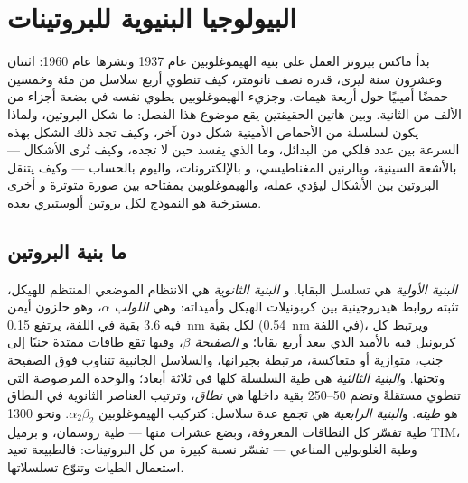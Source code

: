 \chapter{البيولوجيا البنيوية للبروتينات}\label{ch:b3:structural-biology}

بدأ ماكس بيروتز العمل على بنية الهيموغلوبين عام 1937 ونشرها
عام 1960: اثنتان وعشرون سنة ليرى،  قدره نصف
نانومتر، كيف تنطوي أربع سلاسل من مئة وخمسين حمضًا أمينيًا
حول أربعة هيمات. وجزيء الهيموغلوبين يطوي نفسه في بضعة
أجزاء من الألف من الثانية. وبين هاتين الحقيقتين يقع موضوع هذا
الفصل: ما شكل البروتين، ولماذا يكون لسلسلة من الأحماض الأمينية
شكل دون آخر، وكيف تجد ذلك الشكل بهذه السرعة بين عدد
فلكي من البدائل، وما الذي يفسد حين لا تجده،
وكيف تُرى الأشكال --- بالأشعة السينية، وبالرنين المغناطيسي، و
بالإلكترونات، واليوم بالحساب --- وكيف يتنقل البروتين بين
الأشكال ليؤدي عمله، والهيموغلوبين بمفتاحه بين صورة متوترة و
أخرى مسترخية هو النموذج لكل بروتين ألوستيري بعده.

\section{ما بنية البروتين}

\begin{definition}\label{def:b3:structural-biology:levels}
\emph{البنية الأولية} هي تسلسل البقايا. و
\emph{البنية الثانوية} هي الانتظام الموضعي المنتظم
للهيكل، تثبته روابط هيدروجينية بين كربونيلات الهيكل
وأميداته: وهي \emph{اللولب $\alpha$}، وهو حلزون أيمن فيه $3.6$
بقية في اللفة، يرتفع \qty{0.15}{nm} لكل بقية (\qty{0.54}{nm}
في اللفة)، ويرتبط كل كربونيل فيه بالأميد الذي يبعد أربع بقايا؛ و
\emph{الصفيحة $\beta$}، وفيها تقع طاقات ممتدة جنبًا إلى جنب،
متوازية أو متعاكسة، مرتبطة بجيرانها، والسلاسل الجانبية
تتناوب فوق الصفيحة وتحتها. و\emph{البنية الثالثية} هي
طية السلسلة كلها في ثلاثة أبعاد؛ والوحدة المرصوصة التي
تنطوي مستقلةً وتضم \numrange{50}{250} بقية داخلها هي \emph{نطاق}،
وترتيب العناصر الثانوية في النطاق هو \emph{طيته}.
و\emph{البنية الرابعية} هي تجمع عدة سلاسل:
كتركيب الهيموغلوبين $\alpha_{2}\beta_{2}$. ونحو \num{1300} طية تفسّر
كل النطاقات المعروفة، وبضع عشرات منها --- طية روسمان، و
برميل TIM، وطية الغلوبولين المناعي --- تفسّر نسبة كبيرة من كل
البروتينات: فالطبيعة تعيد استعمال الطيات وتنوّع تسلسلاتها.
\end{definition}

